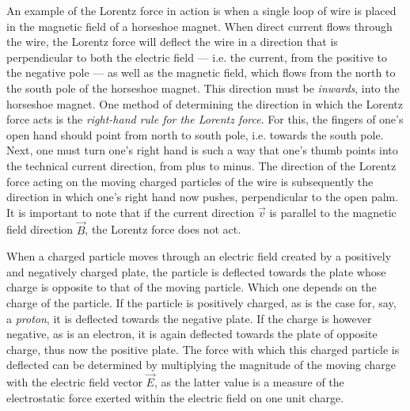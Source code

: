 An example of the Lorentz force in action is when a single loop of wire is placed in the magnetic field of a horseshoe magnet. When direct current flows through the wire, the Lorentz force will deflect the wire in a direction that is perpendicular to both the electric field --- i.e. the current, from the positive to the negative pole --- as well as the magnetic field, which flows from the north to the south pole of the horseshoe magnet. This direction must be \emph{inwards}, into the horseshoe magnet. One method of determining the direction in which the Lorentz force acts is the \emph{right-hand rule for the Lorentz force}. For this, the fingers of one's open hand should point from north to south pole, i.e. towards the south pole. Next, one must turn one's right hand is such a way that one's thumb points into the technical current direction, from plus to minus. The direction of the Lorentz force acting on the moving charged particles of the wire is subsequently the direction in which one's right hand now pushes, perpendicular to the open palm. It is important to note that if the current direction $\vec{v}$ is parallel to the magnetic field direction $\vec{B}$, the Lorentz force does not act.

\pagebreak



When a charged particle moves through an electric field created by a positively and negatively charged plate, the particle is deflected towards the plate whose charge is opposite to that of the moving particle. Which one depends on the charge of the particle. If the particle is positively charged, as is the case for, say, a \emph{proton}, it is deflected towards the negative plate. If the charge is however negative, as is an electron, it is again deflected towards the plate of opposite charge, thus now the positive plate. The force with which this charged particle is deflected can be determined by multiplying the magnitude of the moving charge with the electric field vector $\vec{E}$, as the latter value is a measure of the electrostatic force exerted within the electric field on one unit charge.

